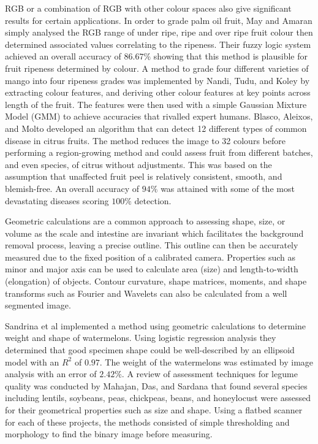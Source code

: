 \documentclass[fleqn,twoside,12pt]{report}
\begin{document}
RGB or a combination of RGB with other colour spaces also give significant results for certain applications. In order to grade palm oil fruit, May and Amaran \cite{may} simply analysed the RGB range of under ripe, ripe and over ripe fruit colour then determined associated values correlating to the ripeness. Their fuzzy logic system achieved an overall accuracy of $86.67\%$ showing that this method is plausible for fruit ripeness determined by colour. A method to grade four different varieties of mango into four ripeness grades was implemented by Nandi, Tudu, and Koley \cite{nandi} by extracting colour features, and deriving other colour features at key points across length of the fruit. The features were then used with a simple Gaussian Mixture Model (GMM) to achieve accuracies that rivalled expert humans. Blasco, Aleixos, and Molto \cite{blasco2} developed an algorithm that can detect 12 different types of common disease in citrus fruits. The method reduces the image to 32 colours before performing a region-growing method and could assess fruit from different batches, and even species, of citrus without adjustments. This was based on the assumption that unaffected fruit peel is relatively consistent, smooth, and blemish-free. An overall accuracy of $94\%$ was attained with some of the most devastating diseases scoring $100\%$ detection. 

Geometric calculations are a common approach to assessing shape, size, or volume as the scale and intestine are invariant which facilitates the background removal process, leaving a precise outline. This outline can then be accurately measured due to the fixed position of a calibrated camera. Properties such as minor and major axis can be used to calculate area (size) and length-to-width (elongation) of objects. Contour curvature, shape matrices, moments, and shape transforms such as Fourier and Wavelets can also be calculated from a well segmented image. 

Sandrina et al \cite{sandrina} implemented a method using geometric calculations to determine weight and shape of watermelons. Using logistic regression analysis they determined that good specimen shape could be well-described by an ellipsoid model with an $R^2$ of $0.97$. The weight of the watermelons was estimated by image analysis with an error of $2.42\%$. A review of assessment techniques for legume quality was conducted by Mahajan, Das, and Sardana \cite{mahajan} that found several species including lentils, soybeans, peas, chickpeas, beans, and honeylocust were assessed for their geometrical properties such as size and shape. Using a flatbed scanner for each of these projects, the methods consisted of simple thresholding and morphology to find the binary image before measuring. 
\end{document}
